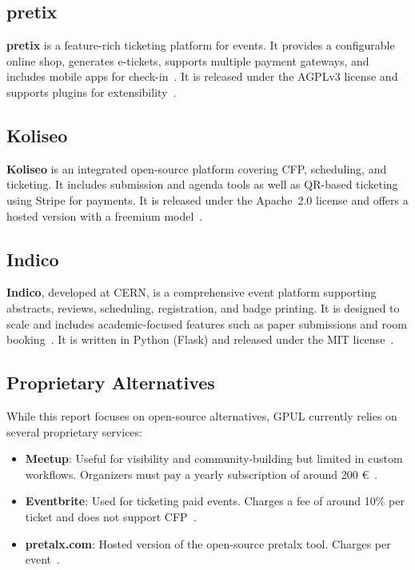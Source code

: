 \subsection{pretix}
\textbf{pretix} is a feature-rich ticketing platform for events. It provides a configurable online shop, generates e-tickets, supports multiple payment gateways, and includes mobile apps for check-in~\cite{pretix-docs}. It is released under the AGPLv3 license and supports plugins for extensibility~\cite{pretix-license-faq}.

\subsection{Koliseo}
\textbf{Koliseo} is an integrated open-source platform covering CFP, scheduling, and ticketing. It includes submission and agenda tools as well as QR-based ticketing using Stripe for payments. It is released under the Apache~2.0 license and offers a hosted version with a freemium model~\cite{koliseo-website}.

\subsection{Indico}
\textbf{Indico}, developed at CERN, is a comprehensive event platform supporting abstracts, reviews, scheduling, registration, and badge printing. It is designed to scale and includes academic-focused features such as paper submissions and room booking~\cite{indico-github}. It is written in Python (Flask) and released under the MIT license~\cite{indico-faq}.

\subsection{Proprietary Alternatives}
While this report focuses on open-source alternatives, GPUL currently relies on several proprietary services:

\begin{itemize}
  \item \textbf{Meetup}: Useful for visibility and community-building but limited in custom workflows. Organizers must pay a yearly subscription of around 200 €~\cite{meetup-wiki}.
  \item \textbf{Eventbrite}: Used for ticketing paid events. Charges a fee of around 10\% per ticket and does not support CFP~\cite{eventbrite-wiki}.
  \item \textbf{pretalx.com}: Hosted version of the open-source pretalx tool. Charges per event~\cite{pretalx-pricing}.
\end{itemize}

